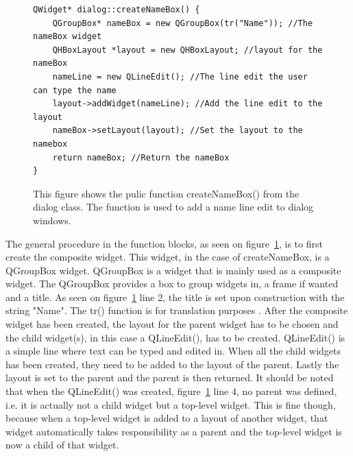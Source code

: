 \begin{figure}[h] %
\centering
\lstset{language=C++} 
\begin{lstlisting}[frame=single]  
QWidget* dialog::createNameBox() {
    QGroupBox* nameBox = new QGroupBox(tr("Name")); //The nameBox widget
    QHBoxLayout *layout = new QHBoxLayout; //layout for the nameBox
    nameLine = new QLineEdit(); //The line edit the user can type the name
    layout->addWidget(nameLine); //Add the line edit to the layout
    nameBox->setLayout(layout); //Set the layout to the namebox
    return nameBox; //Return the nameBox
}
\end{lstlisting}
\caption{This figure shows the pulic function createNameBox() from the dialog class. The function is used to add a name line edit to dialog windows.}
\label{fig:dialogCreateNameBoxCode} 	
\end{figure}

The general procedure in the function blocks, as seen on figure~\ref{fig:dialogCreateNameBoxCode}, is to first create the composite widget. This widget, in the case of createNameBox, is a QGroupBox widget. QGroupBox is a widget that is mainly used as a composite widget. The QGroupBox provides a box to group widgets in, a frame if wanted and a title. As seen on figure~\ref{fig:dialogCreateNameBoxCode} line 2, the title is set upon construction with the string "Name". The tr() function is for translation purposes \cite{QtDocumentationTr}.
After the composite widget has been created, the layout for the parent widget has to be chosen and the child widget(s), in this case a QLineEdit(), has to be created. QLineEdit() is a simple line where text can be typed and edited in. When all the child widgets has been created, they need to be added to the layout of the parent. Lastly the layout is set to the parent and the parent is then returned. It should be noted that when the QLineEdit() was created, figure~\ref{fig:dialogCreateNameBoxCode} line 4, no parent was defined, i.e. it is actually not a child widget but a top-level widget. This is fine though, because when a top-level widget is added to a layout of another widget, that widget automatically takes responsibility as a parent and the top-level widget is now a child of that widget.

